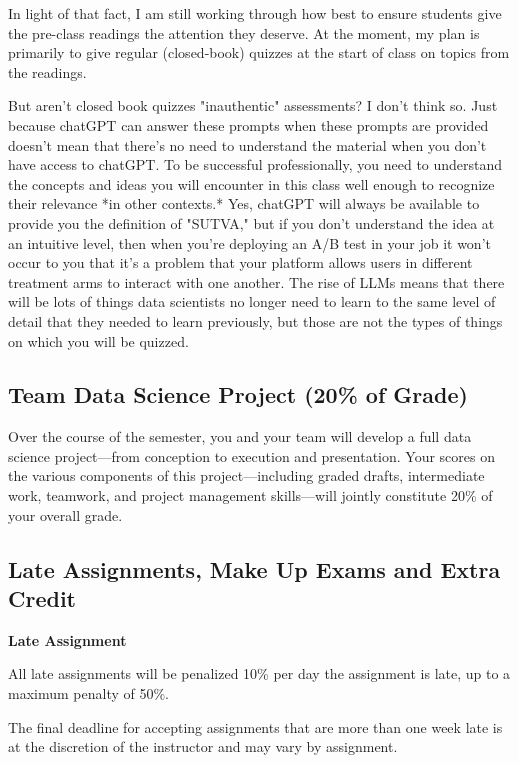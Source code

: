 \documentclass[12pt]{article}
\begin{document}
In light of that fact, I am still working through how best to ensure students give the pre-class readings the attention they deserve. At the moment, my plan is primarily to give regular (closed-book) quizzes at the start of class on topics from the readings.

But aren't closed book quizzes "inauthentic" assessments? I don't think so. Just because chatGPT can answer these prompts when these prompts are provided doesn't mean that there's no need to understand the material when you don't have access to chatGPT. To be successful professionally, you need to understand the concepts and ideas you will encounter in this class well enough to recognize their relevance *in other contexts.* Yes, chatGPT will always be available to provide you the definition of "SUTVA," but if you don't understand the idea at an intuitive level, then when you're deploying an A/B test in your job it won't occur to you that it's a problem that your platform allows users in different treatment arms to interact with one another. The rise of LLMs means that there will be lots of things data scientists no longer need to learn to the same level of detail that they needed to learn previously, but those are not the types of things on which you will be quizzed.

\subsection{Team Data Science Project (20\% of Grade)}

Over the course of the semester, you and your team will develop a full data science project—from conception to execution and presentation. Your scores on the various components of this project—including graded drafts, intermediate work, teamwork, and project management skills—will jointly constitute 20\% of your overall grade.

\subsection{Late Assignments, Make Up Exams and Extra Credit}

\textbf{Late Assignment}

All late assignments will be penalized 10\% per day the assignment is late, up to a maximum penalty of 50\%.

The final deadline for accepting assignments that are more than one week late is at the discretion of the instructor and may vary by assignment. 
\end{document}
